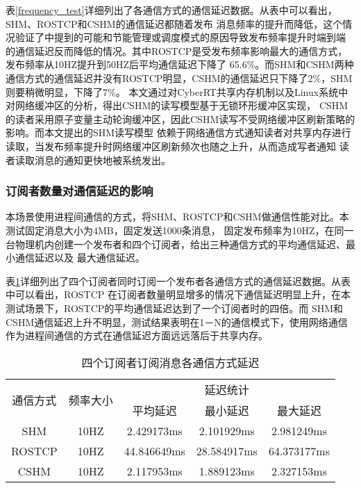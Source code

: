 表\ref{frequency_test}详细列出了各通信方式的通信延迟数据。从表中可以看出，SHM、ROSTCP和CSHM的通信延迟都随着发布
消息频率的提升而降低，这个情况验证了\cite{9591166}中提到的可能和节能管理或调度模式的原因导致发布频率提升时端到端
的通信延迟反而降低的情况。其中ROSTCP是受发布频率影响最大的通信方式，发布频率从10HZ提升到50HZ后平均通信延迟下降了
65.6\%。而SHM和CSHM两种通信方式的通信延迟并没有ROSTCP明显，CSHM的通信延迟只下降了2\%，SHM则要稍微明显，下降了7\%。
本文通过对CyberRT共享内存机制以及Linux系统中对网络缓冲区的分析，得出CSHM的读写模型基于无锁环形缓冲区实现，
CSHM的读者采用原子变量主动轮询缓冲区，因此CSHM读写不受网络缓冲区刷新策略的影响。而本文提出的SHM读写模型
依赖于网络通信方式通知读者对共享内存进行读取，当发布频率提升时网络缓冲区刷新频次也随之上升，从而造成写者通知
读者读取消息的通知更快地被系统发出。

\subsubsection{订阅者数量对通信延迟的影响}
本场景使用进程间通信的方式，将SHM、ROSTCP和CSHM做通信性能对比。本测试固定消息大小为4MB，固定发送1000条消息，
固定发布频率为10HZ，在同一台物理机内创建一个发布者和四个订阅者，给出三种通信方式的平均通信延迟、最小通信延迟以及
最大通信延迟。

表\ref{multi_subscribers}详细列出了四个订阅者同时订阅一个发布者各通信方式的通信延迟数据。从表中可以看出，ROSTCP
在订阅者数量明显增多的情况下通信延迟明显上升，在本测试场景下，ROSTCP的平均通信延迟达到了一个订阅者时的四倍。而
SHM和CSHM通信延迟上升不明显，测试结果表明在1－N的通信模式下，使用网络通信作为进程间通信的方式在通信延迟方面远远落后于共享内存。
\begin{table}[htb]
  \centering\small
  \caption{四个订阅者订阅消息各通信方式延迟}
  \renewcommand\arraystretch{1.2}
  \label{multi_subscribers}
  \begin{tabular}{ccccc}
    \toprule
    \multirow{2}{*}{通信方式} & \multirow{2}{*}{频率大小} & \multicolumn{3}{c}{延迟统计}\\
     & & 平均延迟 & 最小延迟 & 最大延迟\\
    \midrule
    SHM & 10HZ& 2.429173ms& 2.101929ms& 2.981249ms\\ 
    \hline
    ROSTCP & 10HZ& 44.846649ms& 28.584917ms& 64.373177ms\\ 
    \hline
    CSHM & 10HZ& 2.117953ms& 1.889123ms& 2.327153ms\\ 
    \bottomrule
  \end{tabular}
\end{table}

